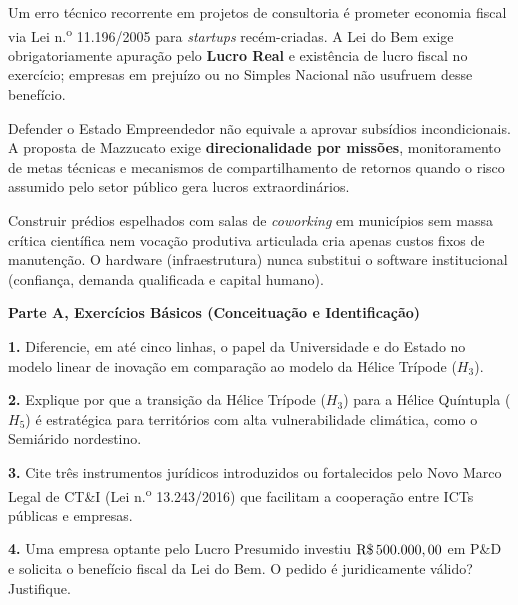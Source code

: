 \begin{boxErro}
Um erro técnico recorrente em projetos de consultoria é prometer economia fiscal via Lei n.\textsuperscript{o} 11.196/2005 para \textit{startups} recém-criadas. A Lei do Bem exige obrigatoriamente apuração pelo \textbf{Lucro Real} e existência de lucro fiscal no exercício; empresas em prejuízo ou no Simples Nacional não usufruem desse benefício.
\end{boxErro}

\begin{boxErro}
Defender o Estado Empreendedor não equivale a aprovar subsídios incondicionais. A proposta de Mazzucato exige \textbf{direcionalidade por missões}, monitoramento de metas técnicas e mecanismos de compartilhamento de retornos quando o risco assumido pelo setor público gera lucros extraordinários.
\end{boxErro}

\begin{boxErro}
Construir prédios espelhados com salas de \textit{coworking} em municípios sem massa crítica científica nem vocação produtiva articulada cria apenas custos fixos de manutenção. O hardware (infraestrutura) nunca substitui o software institucional (confiança, demanda qualificada e capital humano).
\end{boxErro}


\textbf{Parte A, Exercícios Básicos (Conceituação e Identificação)}

\textbf{1.} Diferencie, em até cinco linhas, o papel da Universidade e do Estado no modelo linear de inovação em comparação ao modelo da Hélice Trípode ($H_3$).
\espacoResolucao[1.8cm]

\textbf{2.} Explique por que a transição da Hélice Trípode ($H_3$) para a Hélice Quíntupla ($H_5$) é estratégica para territórios com alta vulnerabilidade climática, como o Semiárido nordestino.
\espacoResolucao[1.8cm]

\textbf{3.} Cite três instrumentos jurídicos introduzidos ou fortalecidos pelo Novo Marco Legal de CT\&I (Lei n.\textsuperscript{o} 13.243/2016) que facilitam a cooperação entre ICTs públicas e empresas.
\espacoResolucao[1.8cm]

\textbf{4.} Uma empresa optante pelo Lucro Presumido investiu $\text{R\$\,}{500.000,00}$ em P\&D e solicita o benefício fiscal da Lei do Bem. O pedido é juridicamente válido? Justifique.
\espacoResolucao[1.8cm]

